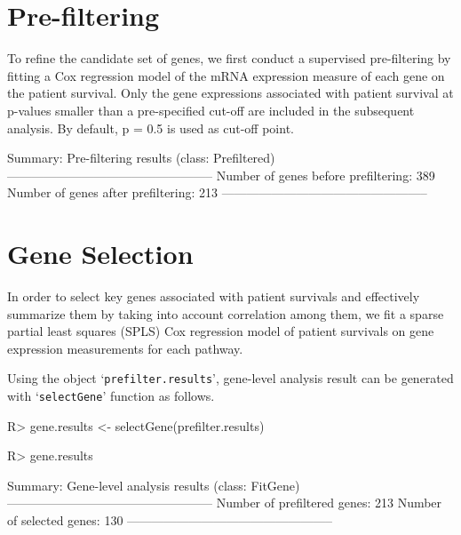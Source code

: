 \documentclass[11pt]{article}
\begin{document}
\section{Pre-filtering}

To refine the candidate set of genes, we first conduct a supervised pre-filtering by fitting a Cox regression model of the mRNA expression measure of each gene on the patient survival. Only the gene expressions associated with patient survival at p-values smaller than a pre-specified cut-off are included in the subsequent analysis. By default, p = 0.5 is used as cut-off point.

\begin{Schunk}
\begin{Soutput}
Summary: Pre-filtering results (class: Prefiltered)
--------------------------------------------------
Number of genes before prefiltering: 389
Number of genes after prefiltering: 213
--------------------------------------------------
\end{Soutput}
\end{Schunk}


\section{Gene Selection}

In order to select key genes associated with patient survivals and effectively summarize them by taking into account correlation among them, we fit a sparse partial least squares (SPLS) Cox regression model \cite{SPLS} of patient survivals on gene expression measurements for each pathway.

Using the object `\texttt{prefilter.results}', gene-level analysis result can be generated with `\texttt{selectGene}' function as follows.

\begin{Schunk}
\begin{Sinput}
R> gene.results <- selectGene(prefilter.results)
\end{Sinput}
\end{Schunk}
\begin{Schunk}
\begin{Sinput}
R> gene.results
\end{Sinput}
\begin{Soutput}
Summary: Gene-level analysis results (class: FitGene)
--------------------------------------------------
Number of prefiltered genes: 213
Number of selected genes: 130
--------------------------------------------------
\end{Soutput}
\end{Schunk}
\end{document}

